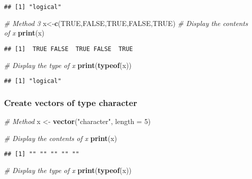 \documentclass[
]{article}
\newenvironment{Shaded}{\begin{snugshade}}{\end{snugshade}}
\newcommand{\AttributeTok}[1]{\textcolor[rgb]{0.13,0.29,0.53}{#1}}
\newcommand{\CommentTok}[1]{\textcolor[rgb]{0.56,0.35,0.01}{\textit{#1}}}
\newcommand{\ConstantTok}[1]{\textcolor[rgb]{0.56,0.35,0.01}{#1}}
\newcommand{\DecValTok}[1]{\textcolor[rgb]{0.00,0.00,0.81}{#1}}
\newcommand{\FunctionTok}[1]{\textcolor[rgb]{0.13,0.29,0.53}{\textbf{#1}}}
\newcommand{\NormalTok}[1]{#1}
\newcommand{\OtherTok}[1]{\textcolor[rgb]{0.56,0.35,0.01}{#1}}
\newcommand{\StringTok}[1]{\textcolor[rgb]{0.31,0.60,0.02}{#1}}
\begin{document}
\begin{verbatim}
## [1] "logical"
\end{verbatim}

\begin{Shaded}
\begin{Highlighting}[]
\CommentTok{\# Method 3}
\NormalTok{x}\OtherTok{\textless{}{-}}\FunctionTok{c}\NormalTok{(}\ConstantTok{TRUE}\NormalTok{,}\ConstantTok{FALSE}\NormalTok{,}\ConstantTok{TRUE}\NormalTok{,}\ConstantTok{FALSE}\NormalTok{,}\ConstantTok{TRUE}\NormalTok{)}
\CommentTok{\# Display the contents of x}
\FunctionTok{print}\NormalTok{(x)}
\end{Highlighting}
\end{Shaded}

\begin{verbatim}
## [1]  TRUE FALSE  TRUE FALSE  TRUE
\end{verbatim}

\begin{Shaded}
\begin{Highlighting}[]
\CommentTok{\# Display the type of x}
\FunctionTok{print}\NormalTok{(}\FunctionTok{typeof}\NormalTok{(x))}
\end{Highlighting}
\end{Shaded}

\begin{verbatim}
## [1] "logical"
\end{verbatim}

\hypertarget{create-vectors-of-type-character}{%
\subsubsection{Create vectors of type
character}\label{create-vectors-of-type-character}}

\begin{Shaded}
\begin{Highlighting}[]
\CommentTok{\# Method }
\NormalTok{x }\OtherTok{\textless{}{-}} \FunctionTok{vector}\NormalTok{(}\StringTok{"character"}\NormalTok{, }\AttributeTok{length =} \DecValTok{5}\NormalTok{)}

\CommentTok{\# Display the contents of x}
\FunctionTok{print}\NormalTok{(x)}
\end{Highlighting}
\end{Shaded}

\begin{verbatim}
## [1] "" "" "" "" ""
\end{verbatim}

\begin{Shaded}
\begin{Highlighting}[]
\CommentTok{\# Display the type of x}
\FunctionTok{print}\NormalTok{(}\FunctionTok{typeof}\NormalTok{(x))}
\end{Highlighting}
\end{Shaded}
\end{document}
